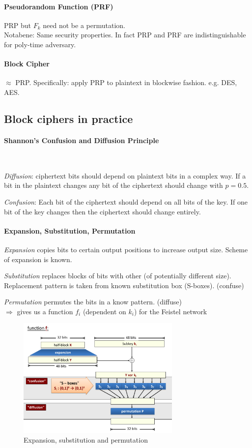 \paragraph{Pseudorandom Function (PRF)} PRP but $F_k$ need not be a permutation.\\
Notabene: Same security properties. In fact PRP and PRF are indistinguishable for poly-time adversary.

\paragraph{Block Cipher} $\approx$ PRP. Specifically: apply PRP to plaintext in blockwise fashion. e.g. DES, AES.


\subsection{Block ciphers in practice}

\paragraph{Shannon's Confusion and Diffusion Principle} ~

\textit{Diffusion}: ciphertext bits should depend on plaintext bits in a complex way. If a bit in the plaintext changes any bit of the ciphertext should change with $p = 0.5$.

\textit{Confusion}: Each bit of the ciphertext should depend on all bits of the key. If one bit of the key changes then the ciphertext should change entirely.

\paragraph{Expansion, Substitution, Permutation} \mbox{}

\textit{Expansion} copies bits to certain output positions to increase output size. Scheme of expansion is known.

\textit{Substitution} replaces blocks of bits with other (of potentially different size). Replacement pattern is taken from known substitution box (S-boxes). (confuse)

\textit{Permutation} permutes the bits in a know pattern. (diffuse)
\\
$\Rightarrow$ gives us a function $f_i$ (dependent on $k_i$) for the Feistel network
\begin{figure}[h]
    \centering
    \includegraphics[width=8cm]{images/ch2-expansion-substitution-permutation.png}
    \caption{Expansion, substitution and permutation}
    \label{fig:exp-subst-perm}
\end{figure}

